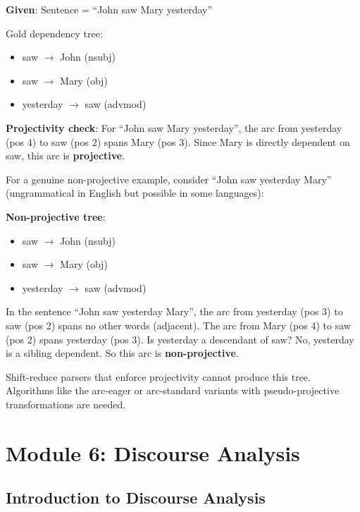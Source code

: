 \documentclass[11pt,a4paper]{article}
\begin{document}
\begin{tcolorbox}[colback=green!5!white,colframe=green!75!black,title=\textbf{Worked Example 34: Dependency Parsing -- Non-Projective Case}]
\textbf{Given}: Sentence = ``John saw Mary yesterday''

Gold dependency tree:
\begin{itemize}
    \item saw $\to$ John (nsubj)
    \item saw $\to$ Mary (obj)
    \item yesterday $\to$ saw (advmod)
\end{itemize}

\textbf{Projectivity check}: For ``John saw Mary yesterday'', the arc from yesterday (pos 4) to saw (pos 2) spans Mary (pos 3). Since Mary is directly dependent on saw, this arc is \textbf{projective}.

For a genuine non-projective example, consider ``John saw yesterday Mary'' (ungrammatical in English but possible in some languages):

\textbf{Non-projective tree}:
\begin{itemize}
    \item saw $\to$ John (nsubj)
    \item saw $\to$ Mary (obj)
    \item yesterday $\to$ saw (advmod)
\end{itemize}

In the sentence ``John saw yesterday Mary'', the arc from yesterday (pos 3) to saw (pos 2) spans no other words (adjacent). The arc from Mary (pos 4) to saw (pos 2) spans yesterday (pos 3). Is yesterday a descendant of saw? No, yesterday is a sibling dependent. So this arc is \textbf{non-projective}.

Shift-reduce parsers that enforce projectivity cannot produce this tree. Algorithms like the arc-eager or arc-standard variants with pseudo-projective transformations are needed.
\end{tcolorbox}

\newpage

\section{Module 6: Discourse Analysis}

\subsection{Introduction to Discourse Analysis}
\end{document}
